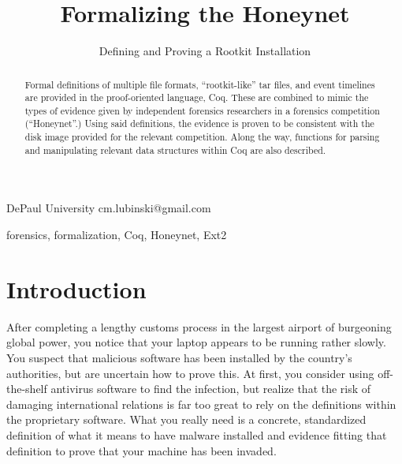 \documentclass[nocopyrightspace]{sigplanconf}
\begin{document}
\lstset{language=coq, basicstyle=\ttfamily\scriptsize, columns=flexible,
keepspaces=true}

\setlength{\pdfpageheight}{\paperheight}
\setlength{\pdfpagewidth}{\paperwidth}



\title{Formalizing the Honeynet}
\subtitle{Defining and Proving a Rootkit Installation}

           {DePaul University}
           {cm.lubinski@gmail.com}

\maketitle

\begin{abstract}
Formal definitions of multiple file formats, ``rootkit-like'' tar files, and
event timelines are provided in the proof-oriented language, Coq. These are
combined to mimic the types of evidence given by independent forensics
researchers in a forensics competition (``Honeynet''.) Using said definitions,
the evidence is proven to be consistent with the disk image provided for the
relevant competition. Along the way, functions for parsing and manipulating
relevant data structures within Coq are also described.
\end{abstract}

\keywords
forensics, formalization, Coq, Honeynet, Ext2

\section{Introduction}

After completing a lengthy customs process in the largest airport of
burgeoning global power, you notice that your laptop appears to be running
rather slowly. You suspect that malicious software has been installed by the
country's authorities, but are uncertain how to prove this. At first, you
consider using off-the-shelf antivirus software to find the infection, but
realize that the risk of damaging international relations is far too great to
rely on the definitions within the proprietary software. What you really need
is a concrete, standardized definition of what it means to have malware
installed and evidence fitting that definition to prove that your machine has
been invaded.
\end{document}
